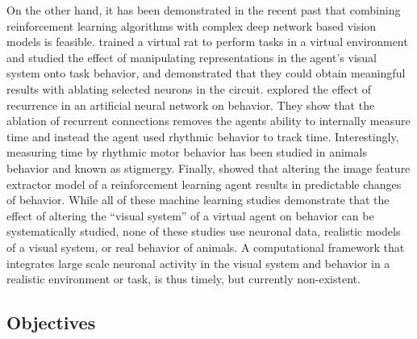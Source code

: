 \documentclass[B2,COG]{ercgrant}
\begin{document}
On the other hand, it has been demonstrated in the recent past that combining reinforcement learning algorithms with complex deep network based vision models is feasible. 
\textcite{Merel2020-hf} trained a virtual rat to perform tasks in a virtual environment and studied the effect of manipulating representations in the agent's visual system onto task behavior, and demonstrated that they could obtain meaningful results with ablating selected neurons in the circuit. 
\textcite{Deverett2019-gs} explored the effect of recurrence in an artificial neural network on behavior. 
They show that the ablation of recurrent connections removes the agents ability to internally measure time and instead the agent used rhythmic behavior to track time. 
Interestingly, measuring time by rhythmic motor behavior has been studied in animals behavior and known as stigmergy.
Finally, \textcite{Hilton2020-jz} showed that altering the image feature extractor model of a reinforcement learning agent results in predictable changes of behavior.
While all of these machine learning studies demonstrate that the effect of altering the ``visual system'' of a virtual agent on behavior can be systematically studied, none of these studies use neuronal data, realistic models of a visual system, or real behavior of animals. 
A computational framework that integrates large scale neuronal activity in the visual system and behavior in a realistic environment or task, is thus timely, but currently non-existent. 

\subsection{Objectives}
\end{document}
